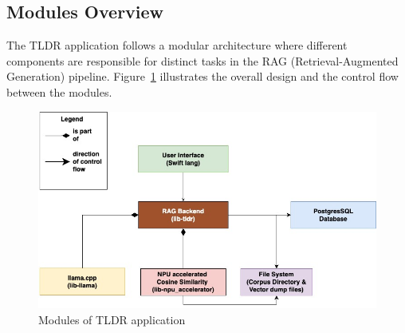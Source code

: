 \subsection{Modules Overview}
\label{subsec:modules_overview}
The TLDR application follows a modular architecture where different components are responsible for distinct tasks in the RAG (Retrieval-Augmented Generation) pipeline. Figure~\ref{fig:tldr_modules} illustrates the overall design and the control flow between the modules.

\begin{figure}[H]
    \centering
    \includegraphics[width=1.0\linewidth]{images/tldr-app-modules.jpg}
    \caption{Modules of TLDR application}
    \label{fig:tldr_modules}
\end{figure}

